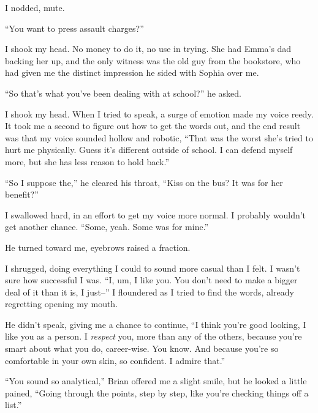 I nodded, mute.



``You want to press assault charges?''



I shook my head.  No money to do it, no use in trying.  She had Emma's dad backing her up, and the only witness was the old guy from the bookstore, who had given me the distinct impression he sided with Sophia over me.



``So that's what you've been dealing with at school?'' he asked.



I shook my head.  When I tried to speak, a surge of emotion made my voice reedy.  It took me a second to figure out how to get the words out, and the end result was that my voice sounded hollow and robotic, ``That was the worst she's tried to hurt me physically.  Guess it's different outside of school.  I can defend myself more, but she has less reason to hold back.''



``So I suppose the,'' he cleared his throat, ``Kiss on the bus?  It was for her benefit?''



I swallowed hard, in an effort to get my voice more normal.  I probably wouldn't get another chance.  ``Some, yeah.  Some was for mine.''



He turned toward me, eyebrows raised a fraction.



I shrugged, doing everything I could to sound more casual than I felt.  I wasn't sure how successful I was.  ``I, um, I like you.  You don't need to make a bigger deal of it than it is, I just--'' I floundered as I tried to find the words, already regretting opening my mouth.



He didn't speak, giving me a chance to continue, ``I think you're good looking, I like you as a person.  I \emph{respect} you, more than any of the others, because you're smart about what you do, career-wise.  You know.  And because you're so comfortable in your own skin, so confident.  I admire that.''



``You sound so analytical,'' Brian offered me a slight smile, but he looked a little pained, ``Going through the points, step by step, like you're checking things off a list.''



